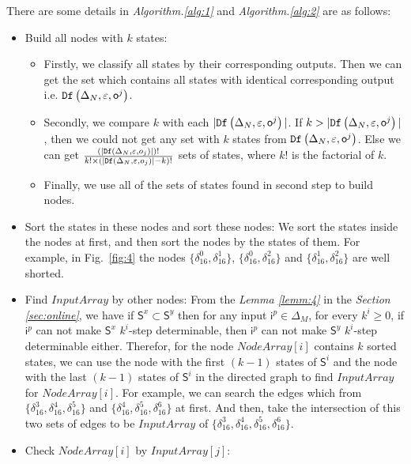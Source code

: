 There are some details in {\em Algorithm.\ref{alg:1}} and {\em Algorithm.\ref{alg:2}} are as follows:
\begin{itemize}
\item Build all nodes with $k$ states:
\begin{itemize}
\item Firstly, we classify all states by their corresponding outputs. Then we can get the set which contains all states with identical corresponding output i.e. ${\tt Df}\left(\Delta_N,\varepsilon,\mathsf{o}^{j}\right)$.
\item Secondly, we compare $k$ with each $|{\tt Df}\left(\Delta_N,\varepsilon,\mathsf{o}^{j}\right)|$. If $k>|{\tt Df}\left(\Delta_N,\varepsilon,\mathsf{o}^{j}\right)|$, then we could not get any set with $k$ states from ${\tt Df}\left(\Delta_N,\varepsilon,\mathsf{o}^{j}\right)$. Else we can get $\frac{(|{\tt Df}\left(\Delta_N,\varepsilon,o_j\right)|)!}{k!\times (|{\tt Df}\left(\Delta_N,\varepsilon,o_j\right)|-k)!}$ sets of states, where $k!$ is the factorial of $k$.
\item Finally, we use all of the sets of states found in second step to build nodes. 
\end{itemize} 
 \item Sort the states in these nodes and sort these nodes: We sort the states inside the nodes at first, and then sort the nodes by the states of them. For example, in Fig.~\ref{fig:4} the nodes $\{\delta_{16}^0,\delta_{16}^1\}$, $\{\delta_{16}^0,\delta_{16}^2\}$ and $\{\delta_{16}^1,\delta_{16}^2\}$ are well shorted. 
  \item Find $InputArray$ by other nodes: From the {\em Lemma \ref{lemm:4}} in the {\em Section \ref{sec:online}}, we have if $\mathsf{S}^{x}\subset \mathsf{S}^{y}$ then for any input $\mathsf{i}^p\in \Delta_M$, for every $k^{i}\ge0$, if $\mathsf{i}^p$ can not make $\mathsf{S}^{x}$ $k^i$-step determinable, then $\mathsf{i}^p$ can not make $\mathsf{S}^{y}$ $k^i$-step determinable either. Therefor, for the node $NodeArray[i]$ contains $k$ sorted states, we can use the node with the first $(k-1)$ states of $\mathsf{S}^i$ and the node with the last $(k-1)$ states of $\mathsf{S}^i$ in the directed graph to find $InputArray$ for $NodeArray[i]$. For example, we can search the edges which from $\{\delta_{16}^3,\delta_{16}^4,\delta_{16}^5\}$ and $\{\delta_{16}^4,\delta_{16}^5,\delta_{16}^6\}$ at first. And then, take the intersection of this two sets of edges to be $InputArray$ of $\{\delta_{16}^3,\delta_{16}^4,\delta_{16}^5,\delta_{16}^6\}$. 
  \item Check $NodeArray[i]$ by $InputArray[j]$:
     

\end{itemize}
